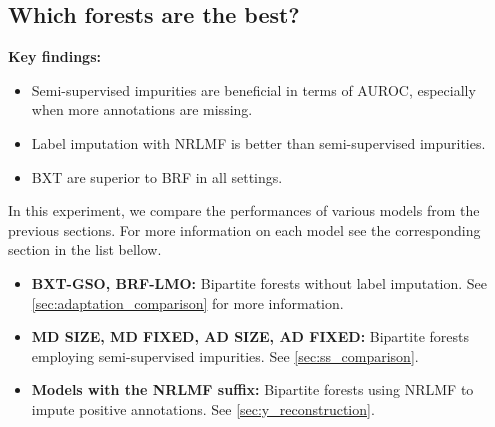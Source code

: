 \subsection{Which forests are the best?}
\label{sec:best_forests}

\begin{mdframed}
    \textbf{Key findings:}
    \begin{itemize}
        \item Semi-supervised impurities are beneficial in terms of AUROC, especially when more annotations are missing.  %
        \item Label imputation with NRLMF is better than semi-supervised impurities.
        \item BXT are superior to BRF in all settings.
    \end{itemize}
\end{mdframed}

In this experiment, we compare the performances of various models from the previous sections. For more information on each model see the corresponding section in the list bellow.

\begin{itemize}
    \item \textbf{BXT-GSO, BRF-LMO:}
    Bipartite forests without label imputation.
    See \autoref{sec:adaptation_comparison} for more information.
    \item \textbf{MD SIZE, MD FIXED, AD SIZE, AD FIXED:}
    Bipartite forests employing semi-supervised impurities.
    See \autoref{sec:ss_comparison}.
    \item \textbf{Models with the NRLMF suffix:} 
    Bipartite forests using NRLMF to impute positive annotations.
    See \autoref{sec:y_reconstruction}.
\end{itemize}



